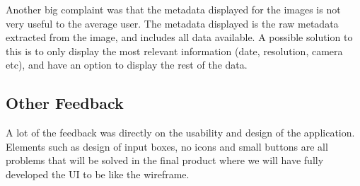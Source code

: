 \documentclass{article}
\begin{document}
Another big complaint was that the metadata displayed for the images is not very useful to the average user. The metadata displayed is the raw metadata extracted from the image, and includes all data available. A possible solution to this is to only display the most relevant information (date, resolution, camera etc), and have an option to display the rest of the data.

\subsection{Other Feedback}
A lot of the feedback was directly on the usability and design of the application. Elements such as design of input boxes, no icons and small buttons are all problems that will be solved in the final product where we will have fully developed the UI to be like the wireframe.
\newpage
\end{document}
